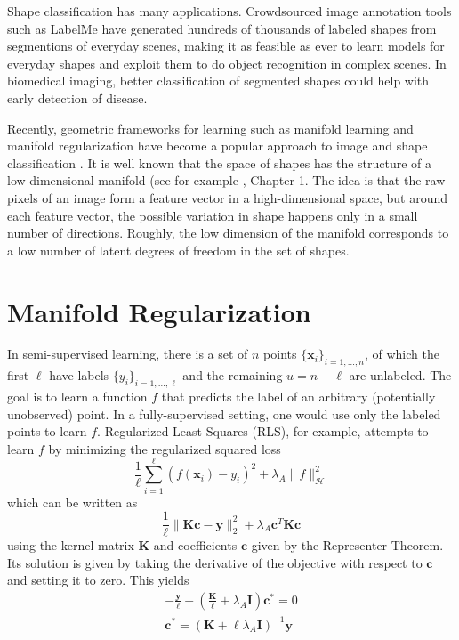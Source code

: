 \documentclass[anon,11pt]{9520} %
\newcommand{\mb}{\mathbf}
\begin{document}
Shape classification has many applications. Crowdsourced image annotation tools
such as LabelMe \cite{LabelMe} have generated hundreds of thousands of labeled
shapes from segmentions of everyday scenes, making it as feasible as ever to
learn models for everyday shapes and exploit them to do object recognition in
complex scenes. In biomedical imaging, better classification of segmented shapes
could help with early detection of disease.

Recently, geometric frameworks for learning such as manifold learning and
manifold regularization \cite{Belkin1}\cite{Belkin2}\cite{Belkin3} have become a
popular approach to image and shape classification
\cite{sdf}\cite{Tuzel}\cite{Zhu}\cite{Gong}. It is well known that the space of
shapes has the structure of a low-dimensional manifold (see for example
\cite{Haykin}, Chapter 1. The idea is that the raw pixels of an image form a
feature vector in a high-dimensional space, but around each feature vector, the
possible variation in shape happens only in a small number of
directions. Roughly, the low dimension of the manifold corresponds to a low
number of latent degrees of freedom in the set of shapes.

\begin{comment}
\begin{figure}
\begin{center}
\texttt{[image: fig/img\_overlay]}
\end{center}
\end{figure}
\end{comment}

\section{Manifold Regularization}
In semi-supervised learning, there is a set of $n$ points $\{\mb
x_i\}_{i=1,\dots,n}$, of which the first $\ell$ have labels
$\{y_i\}_{i=1,\dots,\ell}$ and the remaining $u=n-\ell$ are unlabeled. The goal
is to learn a function $f$ that predicts the label of an arbitrary (potentially
unobserved) point. In a fully-supervised setting, one would use only the labeled
points to learn $f$. Regularized Least Squares (RLS), for example, attempts to
learn $f$ by minimizing the regularized squared loss
\[\frac{1}{\ell}\sum_{i=1}^{\ell} (f(\mb{x}_i)-y_i)^2 + \lambda_A
\|f\|_{\mathcal{H}}^2\] which can be written as \[ \frac{1}{\ell}\|\mb{K}\mb{c}
- \mb{y}\|_2^2 + \lambda_A \mb{c}^T \mb{K} \mb{c} \] using the kernel matrix
$\mb{K}$ and coefficients $\mb{c}$ given by the Representer Theorem. Its
solution is given by taking the derivative of the objective with respect to $\mb
c$ and setting it to zero. This yields
\begin{gather}
-\frac{\mb y}{\ell} + \left( \frac{\mb K}{\ell} + \lambda_A \mb I\right)\mb c^* = 0\\
\mb c^* = \left(\mb K + \ell \lambda_A \mb I\right)^{-1} \mb y \label{eqn:crls}
\end{gather}
\end{document}
